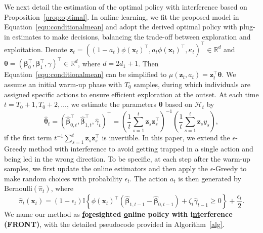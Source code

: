 \documentclass[12pt]{article}
\begin{document}
We next detail the estimation of the optimal policy with interference based on Proposition~\ref{prop:optimal}. In online learning, we fit the proposed model in Equation~\eqref{equ:conditionalmean} and adopt the derived optimal policy with plug-in estimates to make decisions, balancing the trade-off between exploration and exploitation. Denote $\bm{z}_t = ((1-a_t)\phi(\bm{x}_t)^{\top},  a_t\phi(\bm{x}_t)^{\top}, \kappa_t)^{\top} \in \mathbb{R}^d$ and $\bm{\theta} = (\bm{\beta}_0^{\top}, \bm{\beta}_1^{\top}, \gamma)^{\top} \in \mathbb{R}^d$, where $d = 2d_1+1$. Then Equation~\eqref{equ:conditionalmean} can be simplified to $\mu(\bm{z}_t,a_t)=\bm{z}_t^{\top}\bm{\theta}$. We assume an initial warm-up phase with $T_0$ samples, during which individuals are assigned specific actions to ensure efficient exploration at the outset. At each time $t=T_0+1,T_0+2,\dots$, we estimate the parameters $\bm{\theta}$ based on $\mathcal{H}_{t}$ by
\begin{equation}
\label{equ:para}
    \widehat{\bm{\theta}}_{t} =(\widehat{\bm{\beta}}_{0,t}^{\top}, \widehat{\bm{\beta}}_{1,t}^{\top}, \widehat{\gamma}_{t})^{\top}= \left(\frac{1}{t} \sum_{s=1}^{t} \bm{z}_s \bm{z}_s^{\top}\right)^{-1} \left( \frac{1}{t} \sum_{s=1}^t \bm{z}_s y_s \right), 
\end{equation}
if the first term ${t}^{-1} \sum_{s=1}^t \bm{z}_s \bm{z}_s^{\top}$ is invertible. In this paper, we extend the $\epsilon$-Greedy method \citep{chambaz2017,chen2021} with interference to avoid getting trapped in a single action and being led in the wrong direction. To be specific, at each step after the warm-up samples, we first update the online estimators and then apply the $\epsilon$-Greedy to make random choices with probability $\epsilon_t$. The action $a_t$ is then generated by $\text{Bernoulli}(\widehat{\pi}_t)$, where
\begin{equation}
\label{equ:pit}
\widehat{\pi}_t (\bm{x}_t) = (1-\epsilon_t) \mathbb{I}\left\{\phi(\bm{x}_t)^{\top} (\widehat{\bm{\beta}}_{1,t-1} - \widehat{\bm{\beta}}_{0,t-1}) + \zeta_t \widehat{\gamma}_{t-1} \geq 0 \right\} + \frac{\epsilon_t}{2}.
\end{equation}
We name our method as \textbf{\underline{f}o\underline{r}esighted \underline{o}nline policy with i\underline{nt}erference (FRONT)}, with the detailed pseudocode provided in Algorithm~\ref{alg}. 
\end{document}
